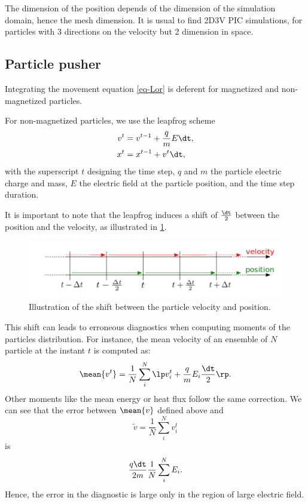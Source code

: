     The dimension of the position depends of the dimension of the simulation domain, hence the mesh dimension.
    It is usual to find \acs{2D}\ac{3V} \ac{PIC} simulations, for particles with 3 directions on the velocity but 2 dimension in space.

    \subsection{Particle pusher}
    Integrating the movement equation \cref{eq-Lor} is deferent for magnetized and non-magnetized particles.

    For non-magnetized particles, we use \cite{birdsall1991} the leapfrog scheme
    \begin{align}\label{eq-leapfrog}
      v^t &= v^{t-1} + \frac{q}{m} E \dt, \\
      x^t &= x^{t-1} + v^t \dt,
    \end{align}
    with the superscript $t$ designing the time step, $q$ and $m$ the particle electric charge and mass, $E$ the electric field at the particle position, and \dt the time step duration.

    It is important to note that the leapfrog induces a shift of $\frac{\dt}{2}$ between the position and the velocity, as illustrated in \cref{fig-leapfrog}.
    \begin{figure}[hbtp]
      \centering
      \includegraphics[width=\defaultwidth]{leapfrog.png}
      \caption{Illustration of the shift between the particle velocity and position.}
      \label{fig-leapfrog}
    \end{figure}
    This shift can leads to erroneous diagnostics when computing moments of the particles distribution.
    For instance, the mean velocity of an ensemble of $N$ particle at the instant $t$ is computed as:
    \begin{equation} \label{eq-meanv}
      \mean{v^t} = \frac{1}{N} \sum_i^N \lp v_i^t + \frac{q}{m} E_i \frac{\dt}{2} \rp.
    \end{equation}
    Other moments like the mean energy or heat flux follow the same correction.
    We can see that the error between $\mean{v}$ defined above and
    $$ \tilde{v} = \frac{1}{N} \sum_i^N  v_i^t $$
    is
    $$\frac{q \dt}{2 m}  \frac{1}{N}  \sum_i^N  E_i .$$
    Hence, the error in the diagnostic is large only in the region of large electric field.

